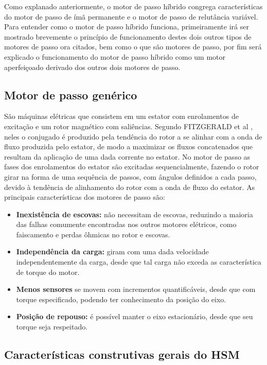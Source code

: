 Como explanado anteriormente, o motor de passo híbrido congrega características do motor de passo de ímã permanente e o motor de passo de relutância variável. Para entender como o motor de passo híbrido funciona, primeiramente irá ser mostrado brevemente o princípio de funcionamento destes dois outros tipos de motores de passo ora citados, bem como o que são motores de passo, por fim será explicado o funcionamento do motor de passo híbrido como um motor aperfeiçoado derivado dos outros dois motores de passo.  

	\subsection{Motor de passo genérico}
	São máquinas elétricas que consistem em um estator com enrolamentos de excitação e um rotor magnético com saliências. Segundo FITZGERALD et al \cite{Fitz}, neles o conjugado é produzido pela tendência do rotor a se alinhar com a onda de fluxo produzida pelo estator, de modo a maximizar os fluxos concatenados que resultam da aplicação de uma dada corrente no estator. No motor de passo as fases dos enrolamentos do estator são excitadas sequencialmente, fazendo o rotor girar na forma de uma sequência de passos, com ângulos definidos a cada passo, devido à tendência de alinhamento do rotor com a onda de fluxo do estator. \cite{Fitz} As principais características dos motores de passo são: \cite{MoonsHSM}
	
	\begin{itemize}
		\item \textbf{Inexistência de escovas:} não necessitam de escovas, reduzindo a maioria das falhas comumente encontradas nos outros motores elétricos, como faiscamento e perdas ôhmicas no rotor e escovas.
		\item \textbf{Independência da carga:} giram com uma dada velocidade independentemente da carga, desde que tal carga não exceda as característica de torque do motor.
		\item \textbf{Menos sensores} se movem com incrementos quantificáveis, desde que com torque especificado, podendo ter conhecimento da posição do eixo.
		\item \textbf{Posição de repouso:} é possível manter o eixo estacionário, desde que seu torque seja respeitado. 
	\end{itemize}
	
	\subsection{Características construtivas gerais do HSM}
	
